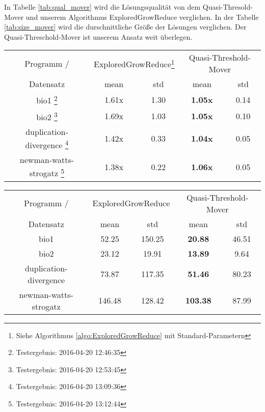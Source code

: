 \documentclass[12pt,a4paper,onecolumn,oneside,titlepage]{article}
\begin{document}
In Tabelle \ref{tab:qual_mover} wird die Lösungsqualität von dem Quasi-Thresold-Mover und unserem Algorithmus ExploredGrowReduce verglichen. In der Tabelle \ref{tab:size_mover} wird die durschnittliche Größe der Lösungen verglichen. 
Der Quasi-Threschold-Mover ist unserem Ansatz weit überlegen. 
\begin{center}
\label{tab:qual_mover}
\begin{tabular}{|c|c c|c c|}

\hline 
Programm / & \multicolumn{2}{c|}{ExploredGrowReduce\footnote{Siehe Algorithmus \ref{algo:ExploredGrowReduce} mit Standard-Parametern }} & \multicolumn{2}{c|}{Quasi-Threshold-Mover} \\ 
Datensatz & \multicolumn{1}{c}{mean}  &  \multicolumn{1}{c|}{std} &  \multicolumn{1}{c}{mean} &  \multicolumn{1}{c|}{std} \\ 
\hline 
bio1 \footnote{Testergebnis: 2016-04-20 12:46:35 } & 1.61x  & 1.30 & \textbf{1.05x} & 0.14 \\ 

bio2 \footnote{Testergebnis: 2016-04-20 12:53:45} & 1.69x & 1.03 & \textbf{1.05x} & 0.10 \\ 

duplication-divergence \footnote{Testergebnis: 2016-04-20 13:09:36} & 1.42x & 0.33 & \textbf{1.04x} & 0.05 \\ 

newman-watts-strogatz \footnote{Testergebnis: 2016-04-20 13:12:44} & 1.38x & 0.22 & \textbf{1.06x} & 0.05 \\ 
\hline 
\end{tabular} 
\end{center}

\begin{center}
\label{tab:size_mover}
\begin{tabular}{|c|c c|c c|}

\hline 
Programm / & \multicolumn{2}{c|}{ExploredGrowReduce} & \multicolumn{2}{c|}{Quasi-Threshold-Mover} \\ 
Datensatz & \multicolumn{1}{c}{mean}  &  \multicolumn{1}{c|}{std} &  \multicolumn{1}{c}{mean} &  \multicolumn{1}{c|}{std} \\ 
\hline 
bio1 & 52.25  & 150.25 & \textbf{20.88} & 46.51 \\ 

bio2 & 23.12 & 19.91 & \textbf{13.89} & 9.64 \\ 

duplication-divergence & 73.87 & 117.35 & \textbf{51.46} & 80.23 \\ 

newman-watts-strogatz & 146.48 & 128.42 & \textbf{103.38} & 87.99 \\ 
\hline 
\end{tabular} 
\end{center}
\end{document}

